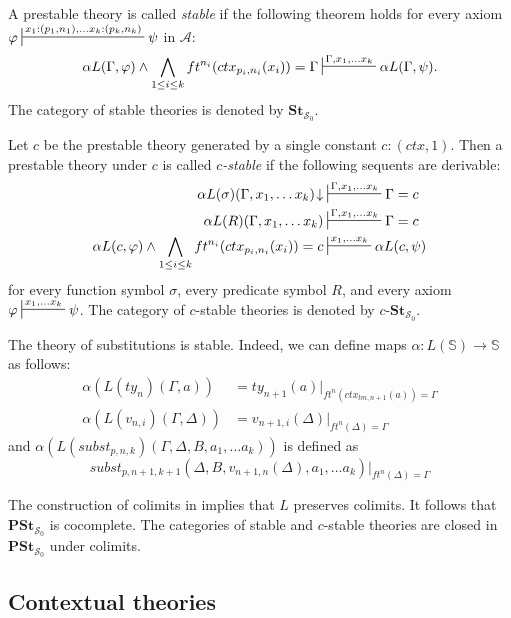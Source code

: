 \documentclass[reqno]{amsart}
\theoremstyle{definition}
\theoremstyle{remark}
\newcommand{\cat}[1]{\mathbf{#1}}
\newcommand{\substTh}{\mathbb{S}}
\newcommand{\St}{\cat{St}}
\newcommand{\PSt}{\cat{PSt}}
\newcommand{\cSt}[1][c]{#1\text{-}\St}
\numberwithin{figure}{section}
\begin{document}
\begin{defn}
A prestable theory is called \emph{stable} if the following theorem holds for every axiom $\varphi \sststile{}{x_1 : (p_1,n_1), \ldots x_k : (p_k,n_k)} \psi$ in $\mathcal{A}$:
\[ \alpha L(\Gamma,\varphi) \land \bigwedge_{1 \leq i \leq k} ft^{n_i}(ctx_{p_i,n_i}(x_i)) = \Gamma \sststile{}{\Gamma, x_1, \ldots x_k} \alpha L(\Gamma,\psi). \]
The category of stable theories is denoted by $\St_{\mathcal{S}_0}$.

Let $c$ be the prestable theory generated by a single constant $c : (ctx,1)$.
Then a prestable theory under $c$ is called \emph{$c$-stable} if the following sequents are derivable:
\begin{align*}
\alpha L(\sigma)(\Gamma, x_1, \ldots x_k)\!\downarrow & \sststile{}{\Gamma, x_1, \ldots x_k} \Gamma = c \\
\alpha L(R)(\Gamma, x_1, \ldots x_k) & \sststile{}{\Gamma, x_1, \ldots x_k} \Gamma = c \\
\alpha L(c,\varphi) \land \bigwedge_{1 \leq i \leq k} ft^{n_i}(ctx_{p_i,n_i}(x_i)) = c & \sststile{}{x_1, \ldots x_k} \alpha L(c,\psi)
\end{align*}
for every function symbol $\sigma$, every predicate symbol $R$, and every axiom $\varphi \sststile{}{x_1, \ldots x_k} \psi$.
The category of $c$-stable theories is denoted by $\cSt_{\mathcal{S}_0}$.
\end{defn}

The theory of substitutions is stable.
Indeed, we can define maps $\alpha : L(\substTh) \to \substTh$ as follows:
\begin{align*}
\alpha(L(ty_n)(\Gamma,a)) & = ty_{n+1}(a)|_{ft^n(ctx_{tm,n+1}(a)) = \Gamma} \\
\alpha(L(v_{n,i})(\Gamma,\Delta)) & = v_{n+1,i}(\Delta)|_{ft^n(\Delta) = \Gamma}
\end{align*}
and $\alpha(L(subst_{p,n,k})(\Gamma, \Delta, B, a_1, \ldots a_k))$ is defined as
\[ subst_{p,n+1,k+1}(\Delta, B, v_{n+1,n}(\Delta), a_1, \ldots a_k)|_{ft^n(\Delta) = \Gamma} \]

The construction of colimits in  implies that $L$ preserves colimits.
It follows that $\PSt_{\mathcal{S}_0}$ is cocomplete.
The categories of stable and $c$-stable theories are closed in $\PSt_{\mathcal{S}_0}$ under colimits.

\subsection{Contextual theories}
\end{document}
